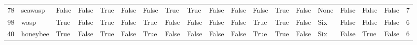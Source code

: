 \begin{tabular}{llllllllllllllllllr}
78  &     seawasp &  False &     False &   True &  False &     False &     True &      True &    False &     False &     False &      True &  False &   None &  False &     False &    False &           7 \\
98  &        wasp &   True &     False &   True &  False &      True &    False &     False &    False &     False &      True &      True &  False &    Six &  False &     False &    False &           6 \\
40  &    honeybee &   True &     False &   True &  False &      True &    False &     False &    False &     False &      True &      True &  False &    Six &  False &      True &    False &           6 \\
\bottomrule
\end{tabular}
